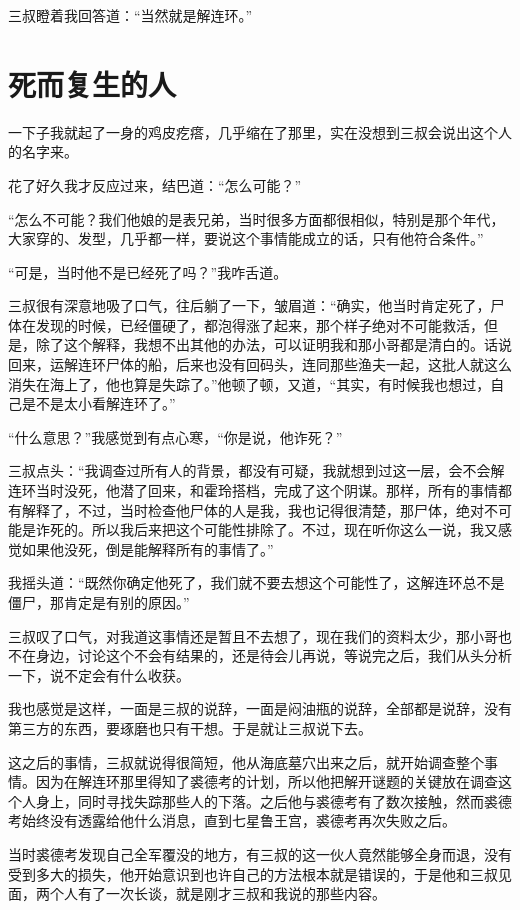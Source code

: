 三叔瞪着我回答道：“当然就是解连环。”

\chapter{死而复生的人}

一下子我就起了一身的鸡皮疙瘩，几乎缩在了那里，实在没想到三叔会说出这个人的名字来。

花了好久我才反应过来，结巴道：“怎么可能？”

“怎么不可能？我们他娘的是表兄弟，当时很多方面都很相似，特别是那个年代，大家穿的、发型，几乎都一样，要说这个事情能成立的话，只有他符合条件。”

“可是，当时他不是已经死了吗？”我咋舌道。

三叔很有深意地吸了口气，往后躺了一下，皱眉道：“确实，他当时肯定死了，尸体在发现的时候，已经僵硬了，都泡得涨了起来，那个样子绝对不可能救活，但是，除了这个解释，我想不出其他的办法，可以证明我和那小哥都是清白的。话说回来，运解连环尸体的船，后来也没有回码头，连同那些渔夫一起，这批人就这么消失在海上了，他也算是失踪了。”他顿了顿，又道，“其实，有时候我也想过，自己是不是太小看解连环了。”

“什么意思？”我感觉到有点心寒，“你是说，他诈死？”

三叔点头：“我调查过所有人的背景，都没有可疑，我就想到过这一层，会不会解连环当时没死，他潜了回来，和霍玲搭档，完成了这个阴谋。那样，所有的事情都有解释了，不过，当时检查他尸体的人是我，我也记得很清楚，那尸体，绝对不可能是诈死的。所以我后来把这个可能性排除了。不过，现在听你这么一说，我又感觉如果他没死，倒是能解释所有的事情了。”

我摇头道：“既然你确定他死了，我们就不要去想这个可能性了，这解连环总不是僵尸，那肯定是有别的原因。”

三叔叹了口气，对我道这事情还是暂且不去想了，现在我们的资料太少，那小哥也不在身边，讨论这个不会有结果的，还是待会儿再说，等说完之后，我们从头分析一下，说不定会有什么收获。

我也感觉是这样，一面是三叔的说辞，一面是闷油瓶的说辞，全部都是说辞，没有第三方的东西，要琢磨也只有干想。于是就让三叔说下去。

这之后的事情，三叔就说得很简短，他从海底墓穴出来之后，就开始调查整个事情。因为在解连环那里得知了裘德考的计划，所以他把解开谜题的关键放在调查这个人身上，同时寻找失踪那些人的下落。之后他与裘德考有了数次接触，然而裘德考始终没有透露给他什么消息，直到七星鲁王宫，裘德考再次失败之后。

当时裘德考发现自己全军覆没的地方，有三叔的这一伙人竟然能够全身而退，没有受到多大的损失，他开始意识到也许自己的方法根本就是错误的，于是他和三叔见面，两个人有了一次长谈，就是刚才三叔和我说的那些内容。

